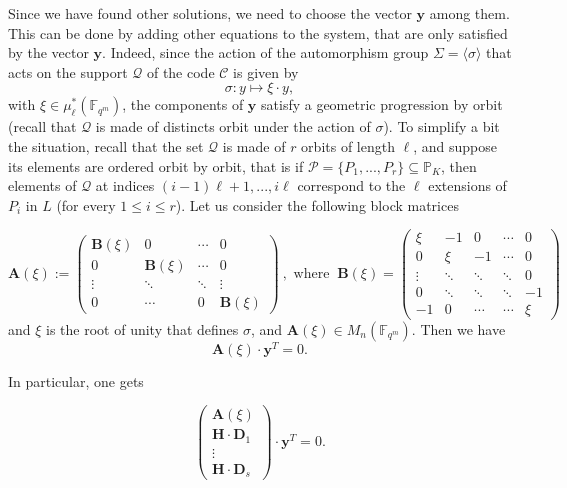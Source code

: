 \documentclass[10pt]{article}
\theoremstyle{definition}
\theoremstyle{definition}
\theoremstyle{definition}
\newcommand{\s}{\vspace{0.3cm}}
\newcommand{\cd}{\cdot}
\newcommand{\PP}{\mathbb{P}}
\newcommand{\fqm}{\mathbb{F}_{q^m}}
\newcommand{\su}{\subseteq}
\newcommand{\PR}{\mathcal{P}}
\newcommand{\QR}{\mathcal{Q}}
\begin{document}
\s

Since we have found other solutions, we need to choose the vector $\mathbf{y}$ among them. This can be done by adding other equations to the system, that are only satisfied by the vector $\mathbf{y}$. Indeed, since the action of the automorphism group $\Sigma = \langle\sigma\rangle$ that acts on the support $\QR$ of the code $\mathcal{C}$ is given by 
\[\sigma : y \longmapsto \xi \cd y,\]
with $\xi \in \mu^*_{\ell}(\fqm)$, the components of $\mathbf{y}$ satisfy a geometric progression by orbit (recall that $\QR$ is made of distincts orbit under the action of $\sigma$). To simplify a bit the situation, recall that the set $\QR$ is made of $r$ orbits of length $\ell$, and suppose its elements are ordered orbit by orbit, that is if $\PR = \{P_1,...,P_r\} \su \PP_K$, then elements of $\QR$ at indices $(i-1)\ell+1,...,i\ell$ correspond to the $\ell$ extensions of $P_{i}$ in $L$ (for every $1\leq i \leq r$). Let us consider the following block matrices

\begin{equation*} 
\mathbf{A}(\xi) := 
\begin{pmatrix}
\mathbf{B}(\xi) & 0 & \cdots & 0 \\
0 & \mathbf{B}(\xi) & \cdots & 0 \\
\vdots & \ddots & \ddots & \vdots \\
0 & \cdots & 0 & \mathbf{B}(\xi)
\end{pmatrix} \ , \textrm{ where }\ 
\mathbf{B}(\xi) = 
\begin{pmatrix}
\xi & -1 & 0 & \cdots & 0 \\
0 & \xi & -1 & \cdots & 0 \\
\vdots & \ddots & \ddots & \ddots & 0 \\
0 & \ddots & \ddots & \ddots & -1 \\
-1 & 0 & \cdots & \cdots & \xi
\end{pmatrix}
\end{equation*}
and $\xi$ is the root of unity that defines $\sigma$, and $\mathbf{A}(\xi) \in M_{n}(\fqm)$. Then we have
\begin{equation*}
\mathbf{A}(\xi) \cd \textbf{y}^T
= 0.
\end{equation*}

In particular, one gets


\begin{equation} \label{system kummer}
\begin{pmatrix}
\mathbf{A}(\xi) \\
\mathbf{H} \cd \mathbf{D}_1 \\
\vdots \\
\mathbf{H} \cd \mathbf{D}_s
\end{pmatrix}
\cd \mathbf{y}^T = 0.
\end{equation}
\end{document}
